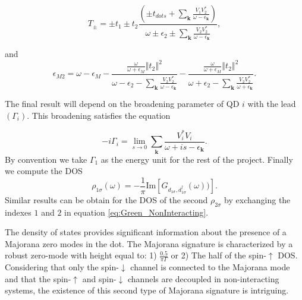 \documentclass[showpacs,aps,prb,reprint,superscriptaddress]{revtex4-1}
\begin{document}
\begin{equation}
    T_{\pm}=\pm t_{1}\pm t_{2}\frac{\left(\pm t_{dots}+\sum_{\mathbf{k}}\frac{V_{1}V_{2}^{*}}{\omega-\epsilon_{\mathbf{k}}}\right)}{\omega\pm\epsilon_{2}\pm\sum_{\mathbf{k}}\frac{V_{2}V_{2}^{*}}{\omega-\epsilon_{\mathbf{k}}}}, \label{eq:T+-}
\end{equation}

\noindent and
\begin{equation}
    \epsilon_{M2}=\omega-\epsilon_{M}-\frac{\frac{\omega}{\omega+\epsilon_{M}}\left\Vert t_{2}\right\Vert ^{2} } {\omega-\epsilon_{2}-\sum_{\mathbf{k}}\frac{V_{2}V_{2}^{*}}{\omega-\epsilon_{\mathbf{k}}}}-\frac{\frac{\omega}{\omega+\epsilon_{M}}\left\Vert t_{2}\right\Vert ^{2}}{\omega+\epsilon_{2}-\sum_{\mathbf{k}}\frac{V_{2}V_{2}^{*}}{\omega+\epsilon_{\mathbf{k}}}}. \label{eq:M2}
\end{equation}



The final result will depend on the broadening parameter of QD $i$ with the lead $(\Gamma_i)$. This broadening satisfies the equation

\begin{equation}
   -i\Gamma_i = \lim_{s\rightarrow 0} \sum_{\boldsymbol{k}}\frac{V_{i}^{*}V_{i}}{\omega+ is -\epsilon_{\boldsymbol{k}}}.
\end{equation}
\noindent By convention we take $\Gamma_1$ as the energy unit for the rest of the project. Finally we compute the DOS 
\begin{equation}
    \rho_{1\sigma}(\omega)=-\frac{1}{\pi} \textrm{Im} \left[G_{d_{1\sigma},d_{1\sigma}^\dagger}(\omega))\right].
    \label{eq:Density of States}
\end{equation}
\noindent Similar results can be obtain for the DOS of the second $\rho_{2\sigma}$ by exchanging the indexes $1$ and $2$ in equation \eqref{eq:Green_NonInteracting}. 

The density of states provides significant information about the presence of a Majorana zero modes in the dot. The Majorana signature is characterized by a robust zero-mode with height equal to: 1) $\frac{0.5}{\pi \Gamma}$ or 2) The half of the spin-$\uparrow$ DOS. Considering that only the spin-$\downarrow$ channel is connected to the Majorana mode and that the spin-$\uparrow$ and spin-$\downarrow$ channels are decoupled in non-interacting systems, the existence of this second type of Majorana signature is intriguing.   
\end{document}
